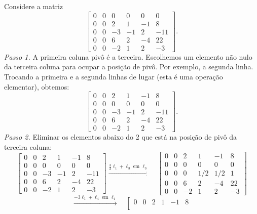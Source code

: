 \begin{ex}\label{escalonada2}
Considere a matriz
\begin{equation}
\left[
\begin{array}{rrrrrr}
   0&0&0&0&0&0 \\
   0&0&2&1&-1&8\\
   0&0&-3&-1&2&-11\\
   0&0&6&2&-4&22\\
   0&0&-2&1&2&-3
\end{array}
\right].
\end{equation}
\textit{Passo 1.} A primeira coluna pivô é a terceira. Escolhemos um elemento não nulo da terceira coluna para ocupar a posição de pivô. Por exemplo, a segunda linha. Trocando a primeira e a segunda linhas de lugar (esta é uma operação elementar), obtemos:
\begin{equation}
\left[
\begin{array}{rrrrrr}
   0&0&2&1&-1&8\\
   0&0&0&0&0&0 \\
   0&0&-3&-1&2&-11\\
   0&0&6&2&-4&22\\
   0&0&-2&1&2&-3
\end{array}
\right].
\end{equation}
\textit{Passo 2.} Eliminar os elementos abaixo do 2 que está na posição de pivô da terceira coluna:
\begin{equation}
\left[
\begin{array}{rrrrrr}
   0&0&2&1&-1&8\\
   0&0&0&0&0&0 \\
   0&0&-3&-1&2&-11\\
   0&0&6&2&-4&22\\
   0&0&-2&1&2&-3
\end{array}
\right]
\xrightarrow{\frac{3}{2}\ell_1 + \ell_3 \text{ em } \ell_3} \quad
\left[
\begin{array}{cccccc}
   0&0&2&1&-1&8\\
   0&0&0&0&0&0 \\
   0&0&0&1/2&1/2&1\\
   0&0&6&2&-4&22\\
   0&0&-2&1&2&-3
\end{array}
\right]
\end{equation}
\begin{equation}
\xrightarrow{-3\ell_1 + \ell_4 \text{ em } \ell_4} \quad
\left[
\begin{array}{cccccc}
   0&0&2&1&-1&8\\

\end{array}
\end{equation}
\end{ex}
